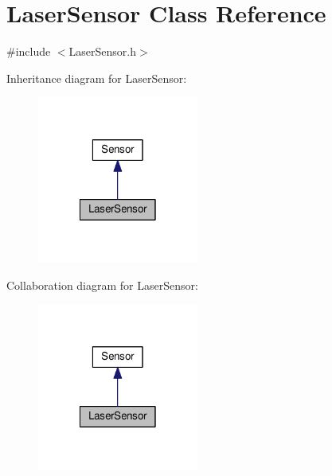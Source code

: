 \hypertarget{classLaserSensor}{\section{Laser\-Sensor Class Reference}
\label{classLaserSensor}
}


{\ttfamily \#include $<$Laser\-Sensor.\-h$>$}



Inheritance diagram for Laser\-Sensor\-:
\nopagebreak
\begin{figure}[H]
\begin{center}
\leavevmode
\includegraphics[width=150pt]{classLaserSensor__inherit__graph}
\end{center}
\end{figure}


Collaboration diagram for Laser\-Sensor\-:
\nopagebreak
\begin{figure}[H]
\begin{center}
\leavevmode
\includegraphics[width=150pt]{classLaserSensor__coll__graph}
\end{center}
\end{figure}
